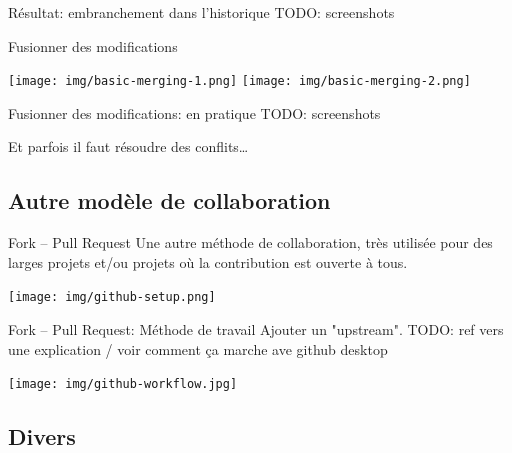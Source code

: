 \documentclass{beamer}
\begin{document}
\begin{frame}{Résultat: embranchement dans l'historique}
    TODO: screenshots
\end{frame}

\begin{frame}{Fusionner des modifications}
\begin{center}
    \texttt{[image: img/basic-merging-1.png]}
    \texttt{[image: img/basic-merging-2.png]}
\end{center}
\end{frame}

\begin{frame}{Fusionner des modifications: en pratique}
    TODO: screenshots

    Et parfois il faut résoudre des conflits\dots
\end{frame}


\subsection{Autre modèle de collaboration}

\begin{frame}{Fork -- Pull Request}
    Une autre méthode de collaboration, très utilisée pour des larges projets
    et/ou projets o\`u la contribution est ouverte à tous.
    \begin{center}
        \texttt{[image: img/github-setup.png]}
    \end{center}
\end{frame}

\begin{frame}{Fork -- Pull Request: Méthode de travail}
    Ajouter un "upstream". TODO: ref vers une explication / voir comment ça marche ave github desktop
    \begin{center}
        \texttt{[image: img/github-workflow.jpg]}
    \end{center}
\end{frame}

\subsection{Divers}

\end{document}
